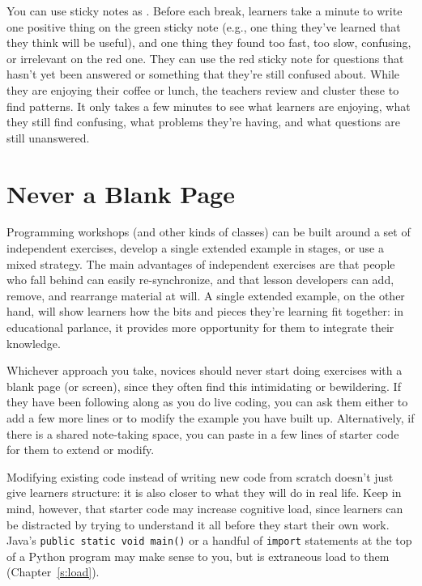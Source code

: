 You can use sticky notes as .
Before each break, learners take a minute to write one positive thing on
the green sticky note (e.g., one thing they've learned that they think
will be useful), and one thing they found too fast, too slow, confusing,
or irrelevant on the red one. They can use the red sticky note for
questions that hasn't yet been answered or something that they're still
confused about. While they are enjoying their coffee or lunch, the
teachers review and cluster these to find patterns. It only takes a few
minutes to see what learners are enjoying, what they still find
confusing, what problems they're having, and what questions are still
unanswered.

\section{Never a Blank Page}\label{s:classroom-blank}

Programming workshops (and other kinds of classes) can be built around a
set of independent exercises, develop a single extended example in
stages, or use a mixed strategy. The main advantages of independent
exercises are that people who fall behind can easily re-synchronize, and
that lesson developers can add, remove, and rearrange material at will.
A single extended example, on the other hand, will show learners how the
bits and pieces they're learning fit together: in educational parlance,
it provides more opportunity for them to integrate their knowledge.

Whichever approach you take, novices should never start doing exercises
with a blank page (or screen), since they often find this intimidating
or bewildering. If they have been following along as you do live coding,
you can ask them either to add a few more lines or to modify the example
you have built up. Alternatively, if there is a shared note-taking
space, you can paste in a few lines of starter code for them to extend
or modify.

Modifying existing code instead of writing new code from scratch doesn't
just give learners structure: it is also closer to what they will do in
real life. Keep in mind, however, that starter code may increase
cognitive load, since learners can be distracted by trying to understand
it all before they start their own work. Java's \texttt{public\ static\ void\ main()} or a handful of \texttt{import} statements at the top of a Python
program may make sense to you, but is extraneous load to them
(Chapter~\ref{s:load}).

